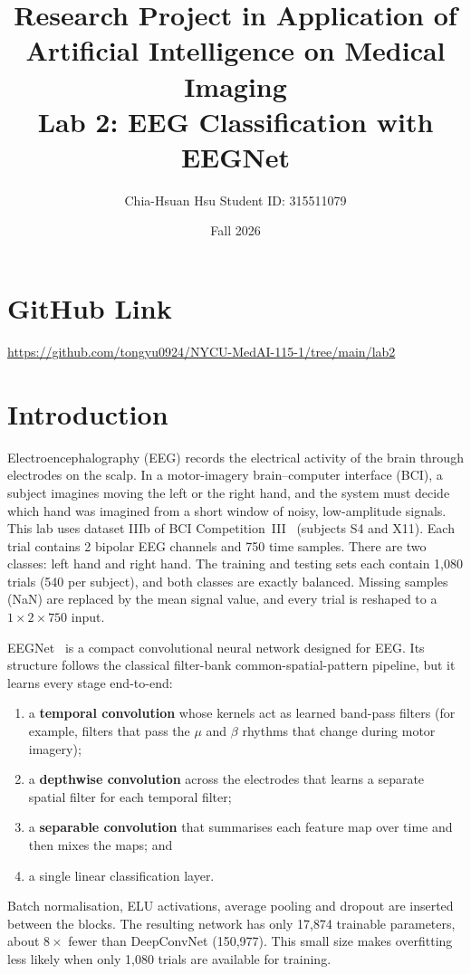 \documentclass[11pt,a4paper]{article}
\title{Research Project in Application of Artificial Intelligence on Medical Imaging\\
Lab 2: EEG Classification with EEGNet}
\author{Chia-Hsuan Hsu \quad Student ID: 315511079}
\date{Fall 2026}
\begin{document}
\maketitle

\section{GitHub Link}
\url{https://github.com/tongyu0924/NYCU-MedAI-115-1/tree/main/lab2}

\section{Introduction}

Electroencephalography (EEG) records the electrical activity of the brain through electrodes on the scalp. In a motor-imagery brain--computer interface (BCI), a subject imagines moving the left or the right hand, and the system must decide which hand was imagined from a short window of noisy, low-amplitude signals. This lab uses dataset IIIb of BCI Competition~III~\cite{bci3b} (subjects S4 and X11). Each trial contains 2 bipolar EEG channels and 750 time samples. There are two classes: left hand and right hand. The training and testing sets each contain 1{,}080 trials (540 per subject), and both classes are exactly balanced. Missing samples (NaN) are replaced by the mean signal value, and every trial is reshaped to a $1\times2\times750$ input.

EEGNet~\cite{eegnet} is a compact convolutional neural network designed for EEG. Its structure follows the classical filter-bank common-spatial-pattern pipeline, but it learns every stage end-to-end:
\begin{enumerate}
  \item a \textbf{temporal convolution} whose kernels act as learned band-pass filters (for example, filters that pass the $\mu$ and $\beta$ rhythms that change during motor imagery);
  \item a \textbf{depthwise convolution} across the electrodes that learns a separate spatial filter for each temporal filter;
  \item a \textbf{separable convolution} that summarises each feature map over time and then mixes the maps; and
  \item a single linear classification layer.
\end{enumerate}
Batch normalisation, ELU activations, average pooling and dropout are inserted between the blocks. The resulting network has only 17{,}874 trainable parameters, about $8\times$ fewer than DeepConvNet (150{,}977). This small size makes overfitting less likely when only 1{,}080 trials are available for training.
\end{document}
